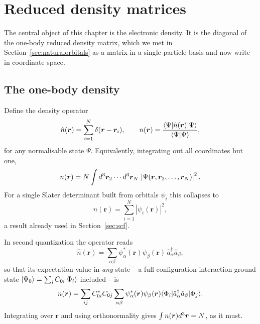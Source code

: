 \section{Reduced density matrices}
\label{sec:reduceddensity}

The central object of this chapter is the electronic density.  It is the
diagonal of the one-body reduced density matrix, which we met in
Section~\ref{sec:naturalorbitals} as a matrix in a single-particle basis and
now write in coordinate space.

\subsection{The one-body density}
\label{sec:onebodydensity}

Define the density operator
\begin{equation}
  \hat{n}(\bm{r}) = \sum_{i=1}^{N}\delta(\bm{r}-\bm{r}_i),
  \qquad
  n(\bm{r}) = \frac{\langle \Psi | \hat{n}(\bm{r}) | \Psi \rangle}
    {\langle \Psi \vert \Psi \rangle},
  \label{eq:8-densityoperator}
\end{equation}
for any normalisable state $\Psi$.  Equivalently, integrating out all
coordinates but one,
\begin{equation}
  n(\bm{r}) = N\int d^3\bm{r}_2\cdots d^3\bm{r}_N\,
    \left\vert\Psi(\bm{r},\bm{r}_2,\dots,\bm{r}_N)\right\vert^2 .
  \label{eq:8-onebodydensity}
\end{equation}
For a single Slater determinant built from orbitals $\psi_i$ this collapses to
\begin{equation}
  n(\bm{r}) = \sum_{i=1}^{N}\left\vert\psi_i(\bm{r})\right\vert^2,
  \label{eq:8-densitydeterminant}
\end{equation}
a result already used in Section~\ref{sec:scf}.

In second quantization the operator reads
\begin{equation}
  \hat{n}(\bm{r}) = \sum_{\alpha\beta}
    \psi^{*}_{\alpha}(\bm{r})\psi_{\beta}(\bm{r})\,
    \hat{a}^{\dagger}_{\alpha}\hat{a}_{\beta},
  \label{eq:8-densitysecondquant}
\end{equation}
so that its expectation value in \emph{any} state -- a full
configuration-interaction ground state
$\vert \Psi_0 \rangle=\sum_i C_{0i}\vert \Phi_i \rangle$ included -- is
\begin{equation}
  n(\bm{r}) = \sum_{ij}C^{*}_{0i}C_{0j}
    \sum_{\alpha\beta}\psi^{*}_{\alpha}(\bm{r})\psi_{\beta}(\bm{r})
    \langle \Phi_i | \hat{a}^{\dagger}_{\alpha}\hat{a}_{\beta} | \Phi_j \rangle.
  \label{eq:8-densityfci}
\end{equation}
Integrating over $\bm{r}$ and using orthonormality gives
$\int n(\bm{r})d^3\bm{r}=N$, as it must.

